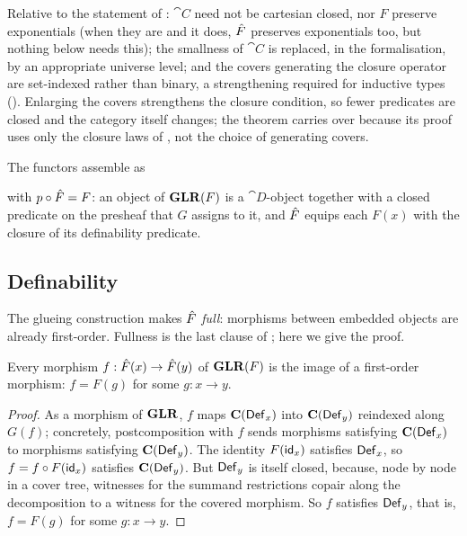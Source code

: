 \begin{remark}
\label{rem:conservativity:glr-deltas}
Relative to the statement of \citet{fiore-simpson99}: $\cat{C}$ need not be cartesian closed, nor
$F$ preserve exponentials (when they are and it does, $\GF$ preserves exponentials too, but nothing
below needs this); the smallness of $\cat{C}$ is replaced, in the formalisation, by an appropriate
universe level; and the covers generating the closure operator are set-indexed rather than binary,
a strengthening required for inductive types (). Enlarging the covers
strengthens the closure condition, so fewer predicates are closed and the category itself changes;
the theorem carries over because its proof uses only the closure laws of
, not the choice of generating covers.
\end{remark}
\noindent
The functors assemble as
\begin{center}
\end{center}
\noindent
with $p \circ \hat{F} = F$: an object of $\mathbf{GLR}(F)$ is a $\cat{D}$-object together with a closed
predicate on the presheaf that $G$ assigns to it, and $\GF$ equips each $F(x)$ with the closure of
its definability predicate.

\subsection{Definability}
\label{sec:conservativity:definability}

The glueing construction makes $\GF$ \emph{full}: morphisms between embedded objects are
already first-order. Fullness is the last clause of ; here we
give the proof.

\begin{lemma}[Fullness of $\GF$]
\label{lem:conservativity:definability}
Every morphism $f : \hat{F}(x) \to \hat{F}(y)$ of $\mathbf{GLR}(F)$ is the image of a first-order morphism: $f = F(g)$
for some $g : x \to y$.
\end{lemma}

\begin{proof}
As a morphism of $\mathbf{GLR}$, $f$ maps $\mathbf{C}(\mathsf{Def}_x)$ into $\mathbf{C}(\mathsf{Def}_y)$ reindexed along
$G(f)$; concretely, postcomposition with $f$ sends morphisms satisfying $\mathbf{C}(\mathsf{Def}_x)$ to
morphisms satisfying $\mathbf{C}(\mathsf{Def}_y)$. The identity $F(\mathsf{id}_x)$ satisfies $\mathsf{Def}_x$, so $f = f
\circ F(\mathsf{id}_x)$ satisfies $\mathbf{C}(\mathsf{Def}_y)$. But $\mathsf{Def}_y$ is itself closed, because, node by
node in a cover tree, witnesses for the summand restrictions copair along the decomposition to a witness
for the covered morphism. So $f$ satisfies $\mathsf{Def}_y$, that is, $f = F(g)$ for some $g : x \to y$.
\end{proof}

